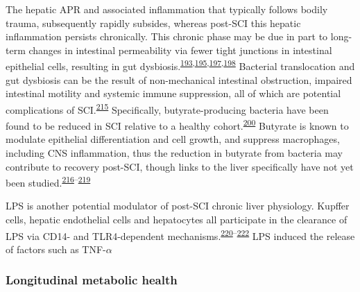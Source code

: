 \documentclass[
]{article}
\begin{document}
The hepatic APR and associated inflammation that typically follows bodily trauma, subsequently rapidly subsides, whereas post-SCI this hepatic inflammation persists chronically.
This chronic phase may be due in part to long-term changes in intestinal permeability via fewer tight junctions in intestinal epithelial cells, resulting in gut dysbiosis.\textsuperscript{\protect\hyperlink{ref-oconnor_investigation_2018}{193},\protect\hyperlink{ref-milosevic_gut-liver_2019}{195},\protect\hyperlink{ref-kigerl_gut_2018}{197},\protect\hyperlink{ref-kigerl_gut_2016}{198}}
Bacterial translocation and gut dysbiosis can be the result of non-mechanical intestinal obstruction, impaired intestinal motility and systemic immune suppression, all of which are potential complications of SCI.\textsuperscript{\protect\hyperlink{ref-balzan_bacterial_2007}{215}}
Specifically, butyrate-producing bacteria have been found to be reduced in SCI relative to a healthy cohort.\textsuperscript{\protect\hyperlink{ref-gungor_intestinal_2016}{200}}
Butyrate is known to modulate epithelial differentiation and cell growth, and suppress macrophages, including CNS inflammation, thus the reduction in butyrate from bacteria may contribute to recovery post-SCI, though links to the liver specifically have not yet been studied.\textsuperscript{\protect\hyperlink{ref-kim_histone_2007}{216}--\protect\hyperlink{ref-chen_valproic_2007}{219}}

LPS is another potential modulator of post-SCI chronic liver physiology.
Kupffer cells, hepatic endothelial cells and hepatocytes all participate in the clearance of LPS via CD14- and TLR4-dependent mechanisms.\textsuperscript{\protect\hyperlink{ref-mimura_role_1995}{220}--\protect\hyperlink{ref-vodovotz_hepatocyte_2001}{222}}
LPS induced the release of factors such as TNF-\(\alpha\)

\hypertarget{longitudinal-metabolic-health}{%
\subsubsection{Longitudinal metabolic health}\label{longitudinal-metabolic-health}}
\end{document}
